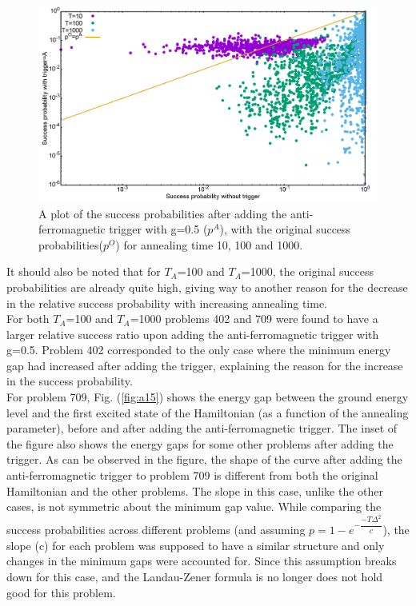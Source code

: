 \documentclass[../main.tex]{subfiles}
\begin{document}
\begin{figure}[H]
\centering 
\includegraphics[scale=0.24]{ProbScat_g0.png}
\caption{A plot of the success probabilities after adding the anti-ferromagnetic trigger with g=0.5 ($p^A$), with the original success probabilities($p^O$) for annealing time 10, 100 and 1000.}
\label{fig:a14}
\end{figure}

It should also be noted that for $T_A$=100 and $T_A$=1000, the original success probabilities are already quite high, giving way to another reason for the decrease in the relative success probability with increasing annealing time. \\

For both $T_A$=100 and $T_A$=1000 problems 402 and 709 were found to have a larger relative success ratio upon adding the anti-ferromagnetic trigger with g=0.5. Problem 402 corresponded to the only case where the minimum energy gap had increased after adding the trigger, explaining the reason for the increase in the success probability.\\
For problem 709, Fig. (\ref{fig:a15}) shows the energy gap between the ground energy level and the first excited state of the Hamiltonian (as a function of the annealing parameter), before and after adding the anti-ferromagnetic trigger. The inset of the figure also shows the energy gaps for some other problems after adding the trigger. As can be observed in the figure, the shape of the curve after adding the anti-ferromagnetic trigger to problem 709 is different from both the original Hamiltonian and the other problems. The slope in this case, unlike the other cases, is not symmetric about the minimum gap value. While comparing the success probabilities across different problems (and assuming $p=1-e^{-\dfrac{-T {\Delta}^2}{c}}$), the slope (c) for  each problem was supposed to have a similar structure and only changes in the minimum gaps were accounted for. Since this assumption breaks down for this case, and the Landau-Zener formula is no longer does not hold good for this problem.\\
\end{document}
